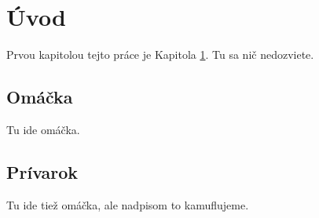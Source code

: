 \chapter{Úvod}\label{chap:intro}

Prvou kapitolou tejto práce je Kapitola \ref{chap:intro}.
Tu sa nič nedozviete.

\section{Omáčka}

Tu ide omáčka.

\section{Prívarok}

Tu ide tiež omáčka, ale nadpisom to kamuflujeme.

